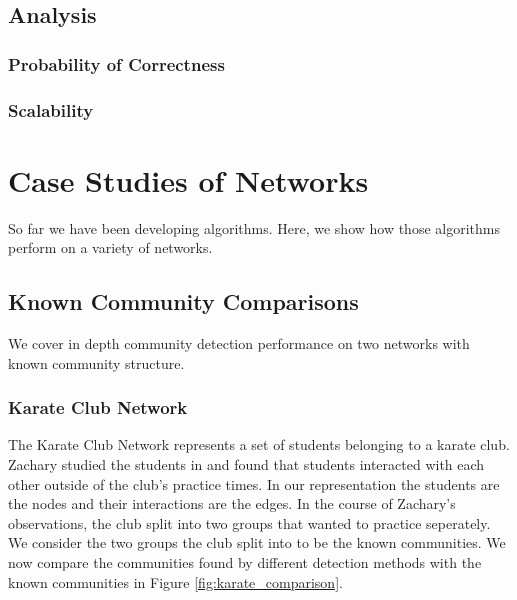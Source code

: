 \documentclass[phd,tocprelim]{cornell}
\begin{document}
\section{Analysis}

\subsection{Probability of Correctness}

\subsection {Scalability}


\chapter{Case Studies of Networks}
\label{ch:datasets}

So far we have been developing algorithms.  Here, we show how those algorithms perform on a variety of networks.


\section{Known Community Comparisons}

We cover in depth community detection performance on two networks with known community structure.

\subsection{Karate Club Network}

The Karate Club Network represents a set of students belonging to a karate club.  Zachary studied the students in \cite{zachary} and found that students interacted with each other outside of the club's practice times.  In our representation the students are the nodes and their interactions are the edges.  In the course of Zachary's observations, the club split into two groups that wanted to practice seperately.  We consider the two groups the club split into to be the known communities.  We now compare the communities found by different detection methods with the known communities in Figure \ref{fig:karate_comparison}.
\end{document}
